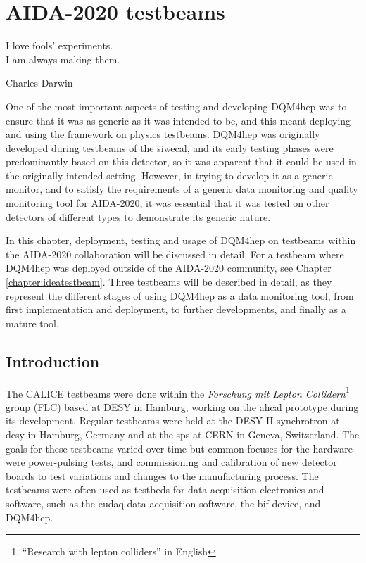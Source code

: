 \chapter{AIDA-2020 testbeams}
\label{chapter:aidatestbeams}
 
\epigraph{I love fools' experiments. \\I am always making them.}{Charles Darwin}

One of the most important aspects of testing and developing DQM4hep was to ensure that it was as generic as it was intended to be, and this meant deploying and using the framework on physics testbeams. DQM4hep was originally developed during testbeams of the \acrfull{siwecal}, and its early testing phases were predominantly based on this detector, so it was apparent that it could be used in the originally-intended setting. However, in trying to develop it as a generic monitor, and to satisfy the requirements of a generic data monitoring and quality monitoring tool for AIDA-2020, it was essential that it was tested on other detectors of different types to demonstrate its generic nature. 

In this chapter, deployment, testing and usage of DQM4hep on testbeams within the AIDA-2020 collaboration will be discussed in detail. For a testbeam where DQM4hep was deployed outside of the AIDA-2020 community, see Chapter \ref{chapter:ideatestbeam}. Three testbeams will be described in detail, as they represent the different stages of using DQM4hep as a data monitoring tool, from first implementation and deployment, to further developments, and finally as a mature tool.

\section{Introduction}
The CALICE testbeams were done within the \textit{Forschung mit Lepton Collidern}\footnote{``Research with lepton colliders'' in English} group (FLC) based at DESY in Hamburg, working on the \acrfull{ahcal} prototype during its development. Regular testbeams were held at the DESY II synchrotron at \acrshort{desy} in Hamburg, Germany and at the \acrfull{sps} at CERN in Geneva, Switzerland. The goals for these testbeams varied over time but common focuses for the hardware were power-pulsing tests, and commissioning and calibration of new detector boards to test variations and changes to the manufacturing process. The testbeams were often used as testbeds for data acquisition electronics and software, such as the \acrshort{eudaq} data acquisition software, the \acrshort{bif} device, and DQM4hep.

